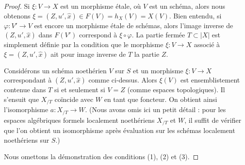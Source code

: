 \begin{proof}
\medskip\noindent
Si $\xi : V \to X$ est un morphisme \'etale, où $V$ est un schéma, alors
nous obtenons $\xi = (Z, u', \hat x) \in F(V) = h_X(V) = X(V)$.
Bien entendu, si $\varphi : V' \to V$ est encore un morphisme \'etale de schémas,
alors l'image inverse de $(Z, u', \hat x)$ dans $F(V')$ correspond à
$\xi \circ \varphi$.
La partie fermée $T \subset |X|$ est simplement définie par la condition que
le morphisme $\xi : V \to X$ associé à $\xi = (Z, u', \hat x)$
ait pour image inverse de $T$ la partie $Z$.

\medskip\noindent
Considérons un schéma noethérien $V$ sur $S$ et un morphisme
$\xi : V \to X$ correspondant à $(Z, u', \hat x)$ comme ci-dessus.
Alors $\xi(V)$ est ensemblistement contenue dans $T$
si et seulement si $V = Z$ (comme espaces topologiques). Il s'ensuit que
$X_{/T}$ coïncide avec $W$ en tant que foncteur. On obtient ainsi l'isomorphisme
$a : X_{/T} \to W$. (Nous avons omis ici un petit détail :
pour les espaces algébriques formels localement noethériens $X_{/T}$ et
$W$, il suffit de vérifier que l'on obtient un isomorphisme après évaluation
sur les schémas localement noethériens sur $S$.)

\medskip\noindent
Nous omettons la démonstration des conditions (1), (2) et (3).
\end{proof}

